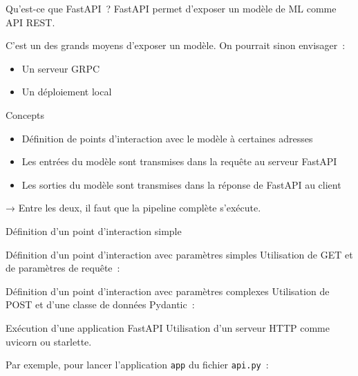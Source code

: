 \begin{frame}{Qu'est-ce que FastAPI~?}
  FastAPI permet d'exposer un modèle de ML comme API REST.

  C'est un des grands moyens d'exposer un modèle. On pourrait sinon envisager~:

  \begin{itemize}
    \item Un serveur GRPC
    \item Un déploiement local
  \end{itemize}
\end{frame}

\begin{frame}{Concepts}
  \begin{itemize}
    \item Définition de points d'interaction avec le modèle à certaines adresses
    \item Les entrées du modèle sont transmises dans la requête au serveur FastAPI
    \item Les sorties du modèle sont transmises dans la réponse de FastAPI au client
  \end{itemize}
  → Entre les deux, il faut que la pipeline complète s'exécute.
\end{frame}

\begin{frame}{Définition d'un point d'interaction simple}
\end{frame}

\begin{frame}{Définition d'un point d'interaction avec paramètres simples}
  Utilisation de GET et de paramètres de requête~:
\end{frame}

\begin{frame}{Définition d'un point d'interaction avec paramètres complexes}
  Utilisation de POST et d'une classe de données Pydantic~:
\end{frame}

\begin{frame}{Exécution d'une application FastAPI}
  Utilisation d'un serveur HTTP comme uvicorn ou starlette.

  Par exemple, pour lancer l'application \texttt{app} du fichier \texttt{api.py}~:

\end{frame}

